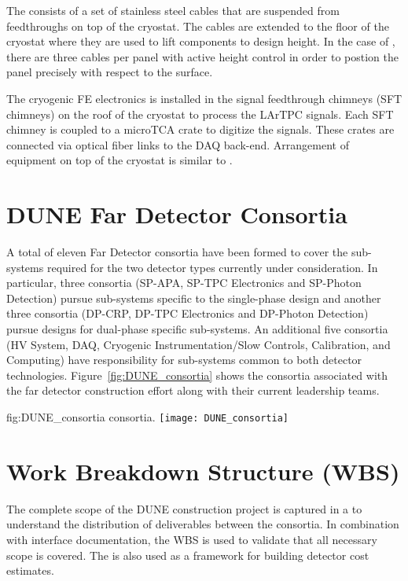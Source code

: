 The   consists of a set of stainless steel
cables that are suspended from feedthroughs on top of the
cryostat. The cables are extended to the floor of the cryostat where
they are used to lift components to design height. In the case of
, there are three cables per panel with active height
control in order to postion the panel precisely with respect to the
 surface.

The cryogenic FE electronics is installed in the signal feedthrough
chimneys (SFT chimneys) on the roof of the cryostat to process the
LArTPC signals. Each SFT chimney is coupled to a microTCA crate to
digitize the signals. These crates are connected via optical fiber links to the DAQ
back-end. Arrangement of equipment on top of the cryostat is similar to .

\section{DUNE Far Detector Consortia}
\label{sec:fdconsortia}

A total of eleven Far Detector consortia have been formed to cover 
the sub-systems required for the two detector types currently under
consideration.  In particular, three consortia (SP-APA, SP-TPC
Electronics and SP-Photon Detection) pursue sub-systems specific to
the single-phase design and another three consortia (DP-CRP, DP-TPC
Electronics and DP-Photon Detection) pursue designs for dual-phase
specific sub-systems.  An additional five consortia (HV System, DAQ,
Cryogenic Instrumentation/Slow Controls, Calibration, and Computing)
have responsibility for sub-systems common to both detector
technologies.  Figure~\ref{fig:DUNE_consortia} shows the consortia 
associated with the far detector construction effort along with their 
current leadership teams.  

\begin{dunefigure}{fig:DUNE_consortia}
  { consortia.}
  \texttt{[image: DUNE\_consortia]}
\end{dunefigure}

\section{Work Breakdown Structure (WBS)}
\label{sec:fdsp-coord-wbs}

The complete scope of the DUNE construction project is captured in a 
 to understand the distribution of deliverables between 
the consortia.  In combination with interface documentation, the 
WBS is used to validate that all necessary scope is covered.  The 
 is also used as a framework for building  
detector cost estimates.

